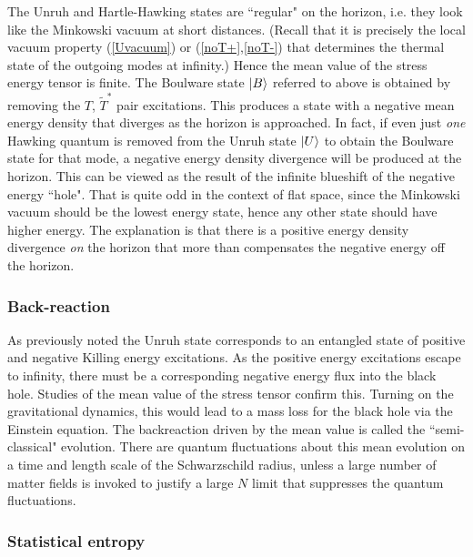 \documentclass[12pt]{article}
\begin{document}
The Unruh and Hartle-Hawking states are ``regular"
on the horizon, i.e. they look like the Minkowski
vacuum at  short distances. 
(Recall that it is precisely the local vacuum property
(\ref{Uvacuum}) or (\ref{noT+},\ref{noT-}) 
that determines the thermal
state of the outgoing modes at infinity.)
Hence the mean value
of the stress energy tensor is finite. The Boulware state
$|B\rangle$ referred to above is obtained by removing
the $T$, $\widetilde{T}^*$ pair excitations. This produces a
state with a negative mean energy density that diverges
as the horizon is approached. In fact, 
if even just {\it one} Hawking quantum is removed from 
the Unruh state $|U\rangle$ to obtain the Boulware state
for that mode, a negative energy density divergence
will be produced at the horizon. This can be viewed as the
result of the infinite blueshift of the negative energy ``hole".
That is quite odd in the
context of flat space, since the Minkowski vacuum should
be the lowest energy state, hence any other state should
have higher energy. The explanation is that there
is a positive energy density divergence {\it on}
the horizon that more than compensates the negative
energy off the horizon\cite{RPpuzzle}.

\subsubsection{Back-reaction}

As previously noted the Unruh state corresponds to 
an entangled state of positive and negative Killing energy
excitations. As the positive energy excitations escape to infinity,
there must be a corresponding negative energy flux into the black hole. Studies of the mean value of the stress tensor confirm this.
Turning on the gravitational dynamics, this would
lead to a mass loss for the black hole via the Einstein equation.
The backreaction driven by the mean value is called the
``semi-classical" evolution. There are quantum fluctuations
about this mean evolution on a time and length scale of the
Schwarzschild radius, unless a large number of matter fields is invoked to justify a large $N$ limit that suppresses the quantum
fluctuations.

\subsubsection{Statistical entropy} 
\end{document}

